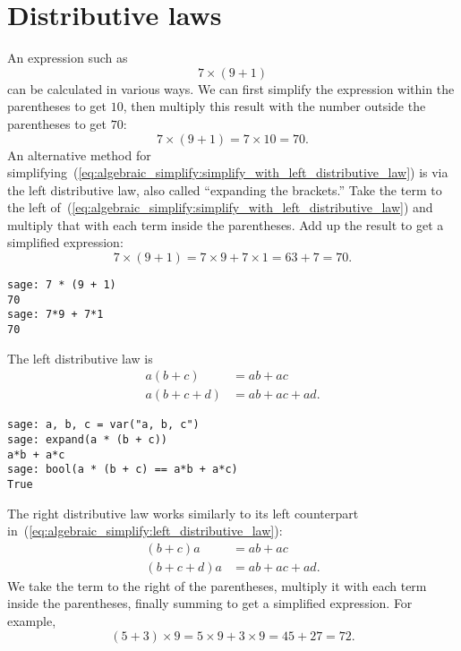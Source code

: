 
\section{Distributive laws}

An expression such as
%
\begin{equation}
\label{eq:algebraic_simplify:simplify_with_left_distributive_law}
7 \times (9 + 1)
\end{equation}
%
can be calculated in various ways. We can first simplify the
expression within the parentheses to get $10$, then multiply this
result with the number outside the parentheses to get $70$:
\[
7 \times (9 + 1)
=
7 \times 10
=
70.
\]
An alternative method for
simplifying~(\ref{eq:algebraic_simplify:simplify_with_left_distributive_law})
is via the left distributive law, also
called ``expanding the brackets.'' Take the term to the left
of~(\ref{eq:algebraic_simplify:simplify_with_left_distributive_law})
and multiply that with each term inside the parentheses. Add up the
result to get a simplified expression:
\[
7 \times (9 + 1)
=
7 \times 9 + 7 \times 1
=
63 + 7
=
70.
\]
%
\begin{lstlisting}
sage: 7 * (9 + 1)
70
sage: 7*9 + 7*1
70
\end{lstlisting}
%
The left distributive law is
%
\begin{equation}
\label{eq:algebraic_simplify:left_distributive_law}
\begin{aligned}
a(b + c) &= ab + ac \\
a(b + c + d) &= ab + ac + ad.
\end{aligned}
\end{equation}

\begin{lstlisting}
sage: a, b, c = var("a, b, c")
sage: expand(a * (b + c))
a*b + a*c
sage: bool(a * (b + c) == a*b + a*c)
True
\end{lstlisting}

The right distributive law works
similarly to its left counterpart
in~(\ref{eq:algebraic_simplify:left_distributive_law}):
%
\begin{equation}
\label{eq:algebraic_simplify:right_distributive_law}
\begin{aligned}
(b + c)a &= ab + ac \\
(b + c + d)a &= ab + ac + ad.
\end{aligned}
\end{equation}
%
We take the term to the right of the parentheses, multiply it with
each term inside the parentheses, finally summing to get a simplified
expression. For example,
\[
(5 + 3) \times 9
=
5 \times 9 + 3 \times 9
=
45 + 27
=
72.
\]

